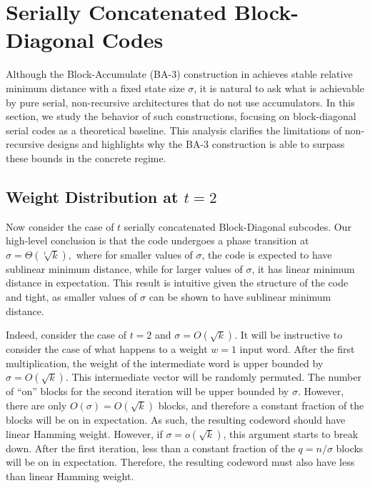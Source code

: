 

\section{Serially Concatenated Block-Diagonal Codes}\label{sec:BDSerial}

Although the Block-Accumulate (BA-3) construction in  achieves stable relative minimum distance with a fixed state size $\sigma$, it is natural to ask what is achievable by pure serial, non-recursive architectures that do not use accumulators. In this section, we study the behavior of such constructions, focusing on block-diagonal serial codes as a theoretical baseline. This analysis clarifies the limitations of non-recursive designs and highlights why the BA-3 construction is able to surpass these bounds in the concrete regime.


\subsection{Weight Distribution at $t= 2$}\label{sec:ttwo}

Now consider the case of $t$ serially concatenated Block-Diagonal subcodes. Our high-level conclusion is that the code undergoes a phase transition at
$
\sigma = \Theta(\sqrt[t]{k}),
$
where for smaller values of $\sigma$, the code is expected to have sublinear minimum distance, while for larger values of $\sigma$, it has linear minimum distance in expectation.
This result is intuitive given the structure of the code and tight, as smaller values of $\sigma$ can be shown to have sublinear minimum distance. 

Indeed, consider the case of $t=2$ and $\sigma=O(\sqrt{k})$. It will be instructive to consider the case of what happens to a weight $w=1$ input word. After the first multiplication, the weight of the intermediate word is upper bounded by $\sigma=O(\sqrt{k})$. This intermediate vector will be randomly permuted. The number of ``on'' blocks for the second iteration will be upper bounded by $\sigma$. However, there are only $O(\sigma)=O(\sqrt{k})$ blocks, and therefore a constant fraction of the blocks will be on in expectation. As such, the resulting codeword should have linear Hamming weight. However, if $\sigma=o(\sqrt{k})$, this argument starts to break down. After the first iteration, less than a constant fraction of the $q=n/\sigma$ blocks will be on in expectation. Therefore, the resulting codeword must also have less than linear Hamming weight. 

